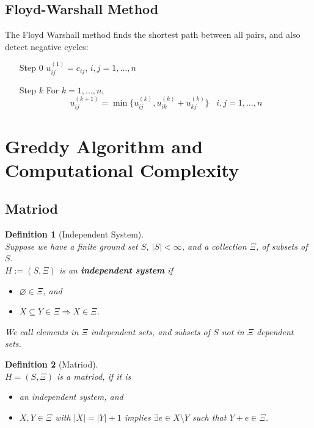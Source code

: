 \documentclass[12pt]{article}
\newtheorem{definition}{Definition}[section]
\theoremstyle{definition}
\begin{document}
\subsection{Floyd-Warshall Method}
The Floyd Warshall method finds the shortest path between all pairs, and also detect negative cycles:
\begin{itemize}
  \item[Step 0] $u_{ij}^{(1)}=c_{ij}$, $i,j= 1,\ldots, n$
  \item[Step $k$] For $k=1,\ldots, n$,
  \[
u_{ij}^{(k+1)} = \min\{u_{ij}^{(k)},u_{ik}^{(k)}+u_{kj}^{(k)}\}\;\;\;i,j=1,\ldots, n
  \]
\end{itemize}
\clearpage
\section{Greddy Algorithm and Computational Complexity}
\subsection{Matriod}
\begin{definition}[Independent System]
\hfill\\\normalfont Suppose we have a finite ground set $S$, $|S|<\infty$, and a collection $\Xi$, of subsets of $S$.\\
$H:=(S,\Xi)$ is an \textbf{independent system} if
\begin{itemize}
  \item $\varnothing\in\Xi$, and
  \item $X\subseteq Y\in\Xi\Rightarrow X\in\Xi$.
\end{itemize}
We call elements in $\Xi$ independent sets, and subsets of $S$ not in $\Xi$ dependent sets.
\end{definition}
\begin{definition}[Matriod]
\hfill\\\normalfont $H=(S,\Xi)$ is a matriod, if it is
\begin{itemize}
  \item an independent system, and
  \item $X,Y\in\Xi$ with $|X|=|Y|+1$ implies $\exists e\in X\setminus Y$ such that $Y+e\in\Xi$.
\end{itemize}
\end{definition}
\end{document}
